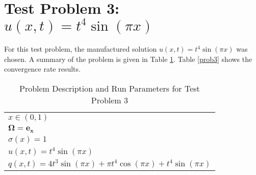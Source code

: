 \documentclass{report}
\begin{document}
\section{Test Problem 3: $u(x,t) = t^4 \sin(\pi x)$}

For this test problem, the manufactured solution $u(x,t) = t^4 \sin(\pi x)$
was chosen.  A summary of the problem is given in Table \ref{prob3params}.
Table \ref{prob3} shows the convergence rate results.

\begin{table}[H]\caption{\label{prob3params}Problem Description and Run Parameters for Test Problem 3}
\begin{center}
\begin{tabular}{l}\hline\hline
$x\in(0,1)$ \\
$\mathbf{\Omega} = \mathbf{e_x}$ \\
$\sigma(x) = 1$ \\
$u(x,t) = t^4\sin(\pi x)$ \\
$q(x,t) = 4t^3\sin(\pi x) + \pi t^4\cos(\pi x) + t^4\sin(\pi x)$ \\\hline\hline
\end{tabular}
\end{center}
\end{table}
\end{document}
